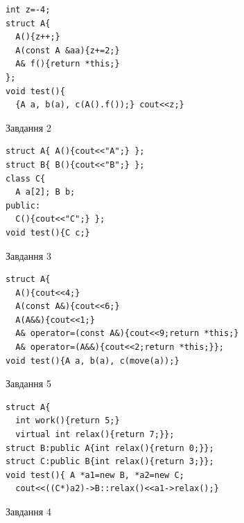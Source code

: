 \documentclass[12pt, ukrainian]{article}
\begin{document}
{{{{{{{{{{{{\begin{minipage}[t]{11cm}
\begin{verbatim}
int z=-4;
struct A{
  A(){z++;}
  A(const A &aa){z+=2;}
  A& f(){return *this;}
};
void test(){
  {A a, b(a), c(A().f());} cout<<z;}
\end{verbatim}            


               
{\begin{center}Завдання {2}\end{center}}
\vspace{-6mm}

\begin{verbatim}
struct A{ A(){cout<<"A";} };
struct B{ B(){cout<<"B";} };
class C{
  A a[2]; B b;
public:
  C(){cout<<"C";} };
void test(){C c;}
\end{verbatim}            


               
{\begin{center}Завдання {3}\end{center}}
\vspace{-6mm}

\begin{verbatim}
struct A{
  A(){cout<<4;}
  A(const A&){cout<<6;}
  A(A&&){cout<<1;}
  A& operator=(const A&){cout<<9;return *this;}
  A& operator=(A&&){cout<<2;return *this;}};
void test(){A a, b(a), c(move(a));}
\end{verbatim}            


               
{\begin{center}Завдання {5}\end{center}}
\vspace{-6mm}

\begin{verbatim}
struct A{
  int work(){return 5;}
  virtual int relax(){return 7;}};
struct B:public A{int relax(){return 0;}};
struct C:public B{int relax(){return 3;}};
void test(){ A *a1=new B, *a2=new C;
  cout<<((C*)a2)->B::relax()<<a1->relax();}
\end{verbatim}            


\end{minipage}
\vline \hspace{8mm}
\begin{minipage}[t]{7cm}
               
{\begin{center}Завдання {4}\end{center}}
\vspace{-6mm}


\end{minipage}}}}}}}}}}}}}
\end{document}
